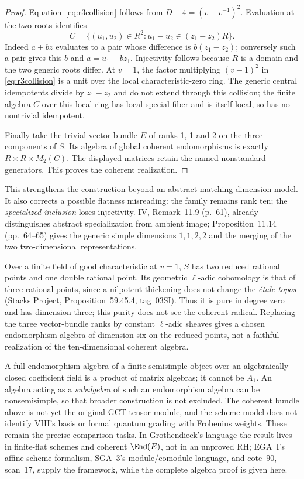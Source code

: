 \begin{proof}
Equation~\eqref{eq:r3collision} follows from $D-4=(v-v^{-1})^2$. Evaluation at the two roots identifies
\[
 C=\{(u_1,u_2)\in R^2:u_1-u_2\in(z_1-z_2)R\}.
\]
Indeed $a+bz$ evaluates to a pair whose difference is $b(z_1-z_2)$; conversely such a pair gives this $b$ and $a=u_1-bz_1$. Injectivity follows because $R$ is a domain and the two generic roots differ. At $v=1$, the factor multiplying $(v-1)^2$ in \eqref{eq:r3collision} is a unit over the local characteristic-zero ring. The generic central idempotents divide by $z_1-z_2$ and do not extend through this collision; the finite algebra $C$ over this local ring has local special fiber and is itself local, so has no nontrivial idempotent.

Finally take the trivial vector bundle $E$ of ranks 1, 1 and 2 on the three components of $S$. Its algebra of global coherent endomorphisms is exactly $R\times R\times M_2(C)$. The displayed matrices retain the named nonstandard generators. This proves the coherent realization.
\end{proof}
This strengthens the construction beyond an abstract matching-dimension model. It also corrects a possible flatness misreading: the family remains rank ten; the \emph{specialized inclusion} loses injectivity. IV, Remark~11.9 (p.~61), already distinguishes abstract specialization from ambient image; Proposition~11.14 (pp.~64--65) gives the generic simple dimensions $1,1,2,2$ and the merging of the two two-dimensional representations.

Over a finite field of good characteristic at $v=1$, $S$ has two reduced rational points and one double rational point. Its geometric \(\ell\)-adic cohomology is that of three rational points, since a nilpotent thickening does not change the \emph{\'etale topos} (Stacks Project, Proposition~59.45.4, tag~03SI). Thus it is pure in degree zero and has dimension three; this purity does not see the coherent radical. Replacing the three vector-bundle ranks by constant \(\ell\)-adic sheaves gives a chosen endomorphism algebra of dimension six on the reduced points, not a faithful realization of the ten-dimensional coherent algebra.

A full endomorphism algebra of a finite semisimple object over an algebraically closed coefficient field is a product of matrix algebras; it cannot be $A_1$. An algebra acting as a \emph{subalgebra} of such an endomorphism algebra can be nonsemisimple, so that broader construction is not excluded. The coherent bundle above is not yet the original GCT tensor module, and the scheme model does not identify VIII's basis or formal quantum grading with Frobenius weights. These remain the precise comparison tasks. In Grothendieck's language the result lives in finite-flat schemes and coherent $\End(E)$, not in an unproved RH; EGA~I's affine scheme formalism, SGA~3's module/comodule language, and cote~90, scan~17, supply the framework, while the complete algebra proof is given here.
